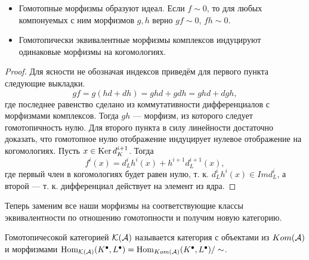 \documentclass[../main.tex]{subfiles}
\begin{document}
\begin{to_suj}
$ $
\begin{itemize}
    \item Гомотопные морфизмы образуют идеал. Если $f\sim 0$, то для любых компонуемых с ним морфизмов $g, h$ верно $gf\sim 0$, $fh\sim 0$.
    \item Гомотопически эквивалентные морфизмы комплексов индуцируют одинаковые морфизмы на когомологиях.
\end{itemize}
\end{to_suj}
\begin{proof}
Для ясности не обозначая индексов приведём для первого пункта следующие выкладки.
\begin{equation*}
        gf = g(hd + dh) = ghd + gdh = ghd + dgh,
\end{equation*}
где последнее равенство сделано из коммутативности дифференциалов с морфизмами комплексов. Тогда $gh$ --- морфизм, из которого следует гомотопичность нулю.
Для второго пункта в силу линейности достаточно доказать, что гомотопное нулю отображение индуцирует нулевое отображение на когомологиях. Пусть $x\in \mathop{\mathrm{Ker}}\nolimits d_K^{i+1}$. Тогда
    \begin{equation*}
        f^i(x) = d_L^{i}h^{i}(x) + h^{i+1}d_L^{i+1}(x),
    \end{equation*}
    где первый член в когомологиях будет равен нулю, т. к. $d_L^{i}h^{i}(x)\in Imd_L^{i}$, а второй --- т. к. дифференциал действует на элемент из ядра.
\end{proof}
Теперь заменим все наши морфизмы на соответствующие классы эквивалентности по отношению гомотопности и получим новую категорию.
\begin{to_def}
Гомотопичесокой категорией $\mathcal{K(\mathcal{A})}$ называется категория с объектами из $Kom(\mathcal{A})$ и морфизмами $\operatorname{Hom}_{\mathcal{K(\mathcal{A})}} (K^\bullet, L^\bullet) = \operatorname{Hom}_{Kom(\mathcal{A})} (K^\bullet, L^\bullet)/\sim$.
\end{to_def}
\end{document}
